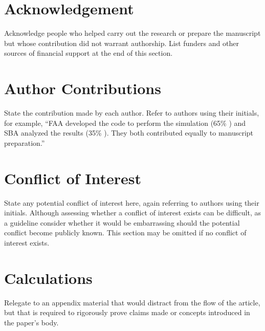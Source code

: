 \documentclass{ledger}
\begin{document}
\section{Acknowledgement}

Acknowledge people who helped carry out the research or prepare the manuscript but whose contribution did not warrant authorship.  List funders and other sources of financial support at the end of this section.

\section{Author Contributions}

State the contribution made by each author.  Refer to authors using their initials, for example, ``FAA developed the code to perform the simulation (65\% ) and SBA analyzed the results (35\% ).  They both contributed equally to manuscript preparation.''

\section{Conflict of Interest}

State any potential conflict of interest here, again referring to authors using their initials.  Although assessing whether a conflict of interest exists can be difficult, as a guideline consider whether it would be embarrassing should the potential conflict become publicly known.  This section may be omitted if no conflict of interest exists.

\appendix

\section{Calculations}

Relegate to an appendix material that would distract from the flow of the article, but that is required to rigorously prove claims made or concepts introduced in the paper’s body.

\theendnotes
\end{document}
